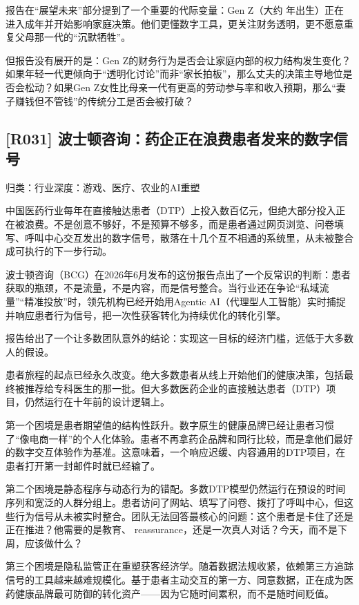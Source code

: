 \documentclass[11pt]{ctexart}
\begin{document}
报告在“展望未来”部分提到了一个重要的代际变量：Gen Z（大约 年出生）正在进入成年并开始影响家庭决策。他们更懂数字工具，更关注财务透明，更不愿意重复父母那一代的“沉默牺牲”。

但报告没有展开的是：Gen Z的财务行为是否会让家庭内部的权力结构发生变化？如果年轻一代更倾向于“透明化讨论”而非“家长拍板”，那么丈夫的决策主导地位是否会松动？如果Gen Z女性比母亲一代有更高的劳动参与率和收入预期，那么“妻子赚钱但不管钱”的传统分工是否会被打破？

\subsection{[R031] 波士顿咨询：药企正在浪费患者发来的数字信号}
{\small\color{refgray}归类：行业深度：游戏、医疗、农业的AI重塑}

中国医药行业每年在直接触达患者（DTP）上投入数百亿元，但绝大部分投入正在被浪费。不是创意不够好，不是预算不够多，而是患者通过网页浏览、问卷填写、呼叫中心交互发出的数字信号，散落在十几个互不相通的系统里，从未被整合成可执行的下一步行动。

波士顿咨询（BCG）在2026年6月发布的这份报告点出了一个反常识的判断：患者获取的瓶颈，不是流量，不是内容，而是信号整合。当行业还在争论“私域流量”“精准投放”时，领先机构已经开始用Agentic AI（代理型人工智能）实时捕捉并响应患者行为信号，把一次性获客转化为持续优化的转化引擎。

报告给出了一个让多数团队意外的结论：实现这一目标的经济门槛，远低于大多数人的假设。

患者旅程的起点已经永久改变。绝大多数患者从线上开始他们的健康决策，包括最终被推荐给专科医生的那一批。但大多数医药企业的直接触达患者（DTP）项目，仍然运行在十年前的设计逻辑上。

第一个困境是患者期望值的结构性跃升。数字原生的健康品牌已经让患者习惯了“像电商一样”的个人化体验。患者不再拿药企品牌和同行比较，而是拿他们最好的数字交互体验作为基准。这意味着，一个响应迟缓、内容通用的DTP项目，在患者打开第一封邮件时就已经输了。

第二个困境是静态程序与动态行为的错配。多数DTP模型仍然运行在预设的时间序列和宽泛的人群分组上。患者访问了网站、填写了问卷、拨打了呼叫中心，但这些行为信号从未被实时整合。团队无法回答最核心的问题：这个患者是卡住了还是正在推进？他需要的是教育、 reassurance，还是一次真人对话？今天，而不是下周，应该做什么？

第三个困境是隐私监管正在重塑获客经济学。随着数据法规收紧，依赖第三方追踪信号的工具越来越难规模化。基于患者主动交互的第一方、同意数据，正在成为医药健康品牌最可防御的转化资产——因为它随时间累积，而不是随时间贬值。
\end{document}
